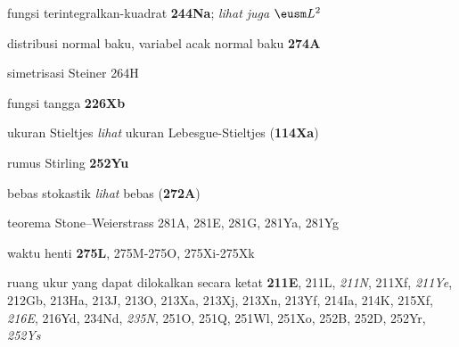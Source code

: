 

fungsi terintegralkan-kuadrat {\bf 244Na};
  {\it lihat juga} $\eusm L^2$











  





distribusi normal baku, variabel acak normal baku {\bf
274A}
















simetrisasi Steiner 264H





fungsi tangga {\bf 226Xb}


ukuran Stieltjes {\it lihat}
ukuran Lebesgue-Stieltjes ({\bf 114Xa})


rumus Stirling {\bf 252Yu}







bebas stokastik {\it lihat} bebas ({\bf 272A})














teorema Stone--Weierstrass 281A, 281E, 281G, 281Ya, 281Yg


waktu henti {\bf 275L}, 275M-275O, 
275Xi-275Xk








ruang ukur yang dapat dilokalkan secara ketat {\bf 211E},
211L, {\it 211N}, 211Xf, {\it 211Ye}, 212Gb,
213Ha, 213J, 213O, 213Xa, 213Xj, 213Xn, 213Yf,
214Ia, 214K, 215Xf, {\it 216E}, 216Yd,
234Nd, {\it 235N}, 251O, 251Q, 251Wl, 251Xo, 252B, 252D,
252Yr, {\it 252Ys}









